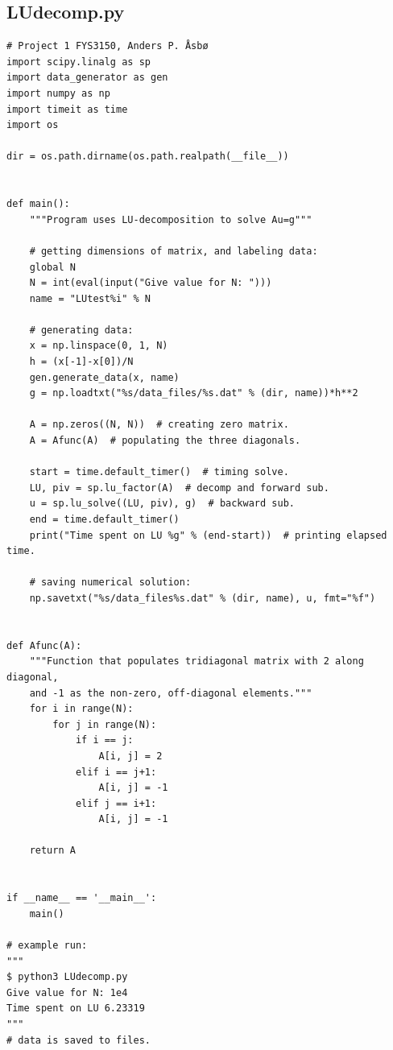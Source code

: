 \documentclass[english,notitlepage]{revtex4-1}  %
\begin{document}
\subsection{LUdecomp.py}\label{A:5}
\begin{lstlisting}
# Project 1 FYS3150, Anders P. Åsbø
import scipy.linalg as sp
import data_generator as gen
import numpy as np
import timeit as time
import os

dir = os.path.dirname(os.path.realpath(__file__))


def main():
    """Program uses LU-decomposition to solve Au=g"""

    # getting dimensions of matrix, and labeling data:
    global N
    N = int(eval(input("Give value for N: ")))
    name = "LUtest%i" % N

    # generating data:
    x = np.linspace(0, 1, N)
    h = (x[-1]-x[0])/N
    gen.generate_data(x, name)
    g = np.loadtxt("%s/data_files/%s.dat" % (dir, name))*h**2

    A = np.zeros((N, N))  # creating zero matrix.
    A = Afunc(A)  # populating the three diagonals.

    start = time.default_timer()  # timing solve.
    LU, piv = sp.lu_factor(A)  # decomp and forward sub.
    u = sp.lu_solve((LU, piv), g)  # backward sub.
    end = time.default_timer()
    print("Time spent on LU %g" % (end-start))  # printing elapsed time.

    # saving numerical solution:
    np.savetxt("%s/data_files%s.dat" % (dir, name), u, fmt="%f")


def Afunc(A):
    """Function that populates tridiagonal matrix with 2 along diagonal,
    and -1 as the non-zero, off-diagonal elements."""
    for i in range(N):
        for j in range(N):
            if i == j:
                A[i, j] = 2
            elif i == j+1:
                A[i, j] = -1
            elif j == i+1:
                A[i, j] = -1

    return A


if __name__ == '__main__':
    main()

# example run:
"""
$ python3 LUdecomp.py
Give value for N: 1e4
Time spent on LU 6.23319
"""
# data is saved to files.

\end{lstlisting}

{}
\end{document}
